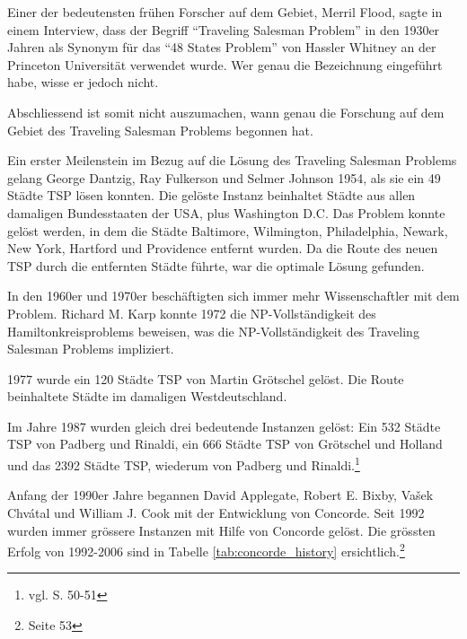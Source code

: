 \documentclass[11pt,a4paper]{article}
\begin{document}
\medskip

Einer der bedeutensten frühen Forscher auf dem Gebiet, Merril Flood, sagte in einem Interview, dass der Begriff "`Traveling Salesman Problem"' in den 1930er Jahren als Synonym für das "`48 States Problem"' von Hassler Whitney an der Princeton Universität verwendet wurde. Wer genau die Bezeichnung eingeführt habe, wisse er jedoch nicht.\cite{interview_merrill_flood84}

Abschliessend ist somit nicht auszumachen, wann genau die Forschung auf dem Gebiet des Traveling Salesman Problems begonnen hat.

\medskip

Ein erster Meilenstein im Bezug auf die Lösung des Traveling Salesman Problems gelang George Dantzig, Ray Fulkerson und Selmer Johnson 1954, als sie ein 49 Städte TSP lösen konnten. Die gelöste Instanz beinhaltet Städte aus allen damaligen Bundesstaaten der USA, plus Washington D.C. Das Problem konnte gelöst werden, in dem die Städte Baltimore, Wilmington, Philadelphia, Newark, New York, Hartford und Providence entfernt wurden. Da die Route des neuen TSP durch die entfernten Städte führte, war die optimale Lösung gefunden.

In den 1960er und 1970er beschäftigten sich immer mehr Wissenschaftler mit dem Problem. Richard M. Karp konnte 1972 die NP-Vollständigkeit des Hamiltonkreisproblems beweisen, was die NP-Vollständigkeit des Traveling Salesman Problems impliziert.

1977 wurde ein 120 Städte TSP von Martin Grötschel gelöst. Die Route beinhaltete Städte im damaligen Westdeutschland.

Im Jahre 1987 wurden gleich drei bedeutende Instanzen gelöst: Ein 532 Städte TSP von Padberg und Rinaldi, ein 666 Städte TSP von Grötschel und Holland und das 2392 Städte TSP, wiederum von Padberg und Rinaldi.\footnote{vgl. \cite{applegate06} S. 50-51}

Anfang der 1990er Jahre begannen David Applegate, Robert E. Bixby, Vašek Chvátal und William J. Cook mit der Entwicklung von Concorde. Seit 1992 wurden immer grössere Instanzen mit Hilfe von Concorde gelöst. Die grössten Erfolg von 1992-2006 sind in Tabelle \ref{tab:concorde_history} ersichtlich.\footnote{\cite{applegate06} Seite 53}
\end{document}
